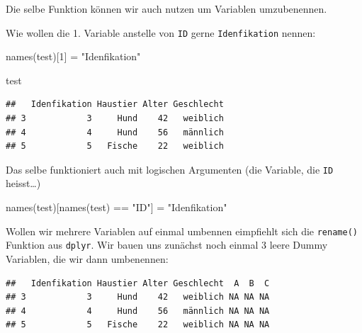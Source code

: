 \documentclass[
]{book}
\newenvironment{Shaded}{\begin{snugshade}}{\end{snugshade}}
\newcommand{\ConstantTok}[1]{\textcolor[rgb]{0.00,0.00,0.00}{#1}}
\newcommand{\DecValTok}[1]{\textcolor[rgb]{0.00,0.00,0.81}{#1}}
\newcommand{\FunctionTok}[1]{\textcolor[rgb]{0.00,0.00,0.00}{#1}}
\newcommand{\NormalTok}[1]{#1}
\newcommand{\OtherTok}[1]{\textcolor[rgb]{0.56,0.35,0.01}{#1}}
\newcommand{\SpecialCharTok}[1]{\textcolor[rgb]{0.00,0.00,0.00}{#1}}
\newcommand{\StringTok}[1]{\textcolor[rgb]{0.31,0.60,0.02}{#1}}
\begin{document}
Die selbe Funktion können wir auch nutzen um Variablen umzubenennen.

Wie wollen die 1. Variable anstelle von \texttt{ID} gerne \texttt{Idenfikation} nennen:

\begin{Shaded}
\begin{Highlighting}[]
\FunctionTok{names}\NormalTok{(test)[}\DecValTok{1}\NormalTok{] }\OtherTok{=} \StringTok{"Idenfikation"}

\NormalTok{test}
\end{Highlighting}
\end{Shaded}

\begin{verbatim}
##   Idenfikation Haustier Alter Geschlecht
## 3            3     Hund    42   weiblich
## 4            4     Hund    56   männlich
## 5            5   Fische    22   weiblich
\end{verbatim}

Das selbe funktioniert auch mit logischen Argumenten (die Variable, die \texttt{ID} heisst\ldots)

\begin{Shaded}
\begin{Highlighting}[]
\FunctionTok{names}\NormalTok{(test)[}\FunctionTok{names}\NormalTok{(test) }\SpecialCharTok{==} \StringTok{"ID"}\NormalTok{] }\OtherTok{=} \StringTok{"Idenfikation"}
\end{Highlighting}
\end{Shaded}

Wollen wir mehrere Variablen auf einmal umbennen eimpfiehlt sich die \texttt{rename()} Funktion aus \texttt{dplyr}. Wir bauen uns zunächst noch einmal 3 leere Dummy Variablen, die wir dann umbenennen:

\begin{Shaded}
\end{Shaded}

\begin{verbatim}
##   Idenfikation Haustier Alter Geschlecht  A  B  C
## 3            3     Hund    42   weiblich NA NA NA
## 4            4     Hund    56   männlich NA NA NA
## 5            5   Fische    22   weiblich NA NA NA
\end{verbatim}
\end{document}
